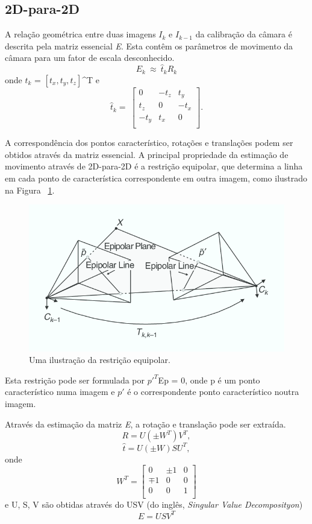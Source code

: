 \subsection{2D-para-2D}

A relação geométrica entre duas imagens \textit{$I_k$} e \textit{$I_{k-1}$} da calibração da câmara é descrita pela matriz essencial \textit{E}. Esta contêm os parâmetros de movimento da câmara para um fator de escala desconhecido. \[ E_k\ \approx\ {\hat{t}}_kR_k \] onde \textit{$t_k$} = $[\textit{$t_x, t_y, t_z$}]$^T e \[ \hat{t}_k =\ \left[\begin{array}{ccc}0&-t_z&t_y\\t_z&0&-t_x\\-t_y&t_x&0\\\end{array}\right] . \]

A correspondência dos pontos característico, rotações e translações podem ser obtidos através da matriz essencial. A principal propriedade da estimação de movimento através de 2D-para-2D é a restrição equipolar, que determina a linha em cada ponto de característica correspondente em outra imagem, como ilustrado na Figura ~\ref{fig:epipolarconstrait}.

\begin{figure}[h!]
	\centering
	\includegraphics[width=0.7\linewidth]{figures/equipolarline}
	\caption{Uma ilustração da restrição equipolar. \cite{VOpart1}}
	\label{fig:epipolarconstrait}
\end{figure}

 Esta restrição pode ser formulada por $p'^{T}$Ep = 0, onde p é um ponto característico numa imagem e $p'$ é o correspondente ponto característico noutra imagem.
 
 Através da estimação da matriz \textit{E}, a rotação e translação pode ser extraída. 
 \[ R = U(\pm W^T)V^T ,\] \[ \hat{t} =  U(\pm W)SU^T, \] 
 onde \[  W^T = \left[\begin{array}{ccc}0&\pm1&0\\\mp1&0&0\\0&0&1\\\end{array}\right] \] 
 e U, S, V são obtidas através do USV (do inglês, \textit{Singular Value Decomposityon}) \[ E = USV^T \]
 
